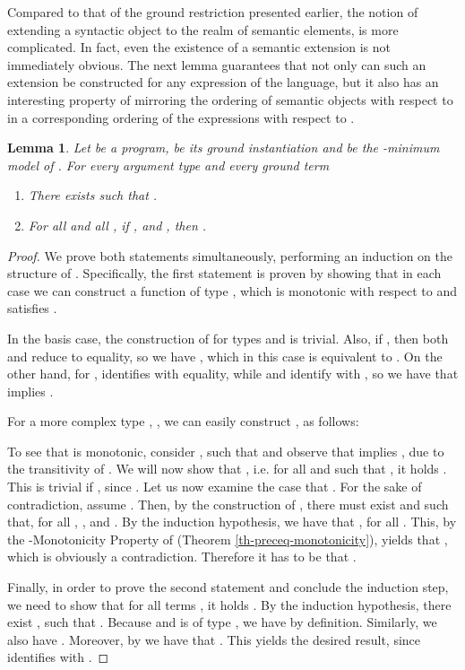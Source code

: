 \documentclass[submission,copyright]{eptcs}
\newtheorem{lemma}{Lemma}
\theoremstyle{definition}
\begin{document}
{Compared to that of the ground restriction presented earlier, the notion of
extending a syntactic object to the realm of semantic elements, is more complicated.
In fact, even the existence of a semantic extension is not immediately obvious.
The next lemma guarantees that not only can such an extension  be constructed
for any expression of the language, but it also has an interesting property of
mirroring the ordering of semantic objects with respect to  in a
corresponding ordering of the expressions with respect to .}
\begin{lemma} \label{lm_order_preservation}
Let  be a program,  be its ground instantiation and
 be the -minimum model of . For every
argument type  and every ground term 
\begin{enumerate}
\item There exists  such that .
\item For all  and all , if ,  and , then .
\end{enumerate}
\end{lemma}
\begin{proof}
We prove both statements simultaneously, performing an induction on the structure
of . Specifically, the first statement is proven by showing that in each
case we can construct a function  of type , which is monotonic with
respect to  and satisfies .

In the basis case, the construction of  for types  and  is trivial.
Also, if , then both  and  reduce to equality,
so we have , which in this case is equivalent to
. On the other hand, for
,  identifies with equality, while  and
 identify with , so we have that
  implies
 .

For a more complex type , ,
we can easily construct , as follows:

To see that  is monotonic, consider ,
such that  and observe
that  implies , due to
the transitivity of .
We will now show that , i.e. for all  and
 such that , it
holds . This is trivial
if , since . Let
us now examine the case that . For the
sake of contradiction, assume . Then,
by the construction of , there must exist  and 
such that, for all , ,  and . By the induction hypothesis, we have that , for all . This, by the -Monotonicity Property of  (Theorem \ref{th-preceq-monotonicity}), yields that , which is obviously a contradiction. Therefore it has to be that .

Finally, in order to prove the second statement and conclude the induction step, we need to show that for all terms ,
it holds . By the induction hypothesis, there exist , such that .
Because  and  is of type , we
have  by definition.
Similarly, we also have . Moreover,
by  we have that
. This yields the desired result, since  identifies with .
\end{proof}
\end{document}
